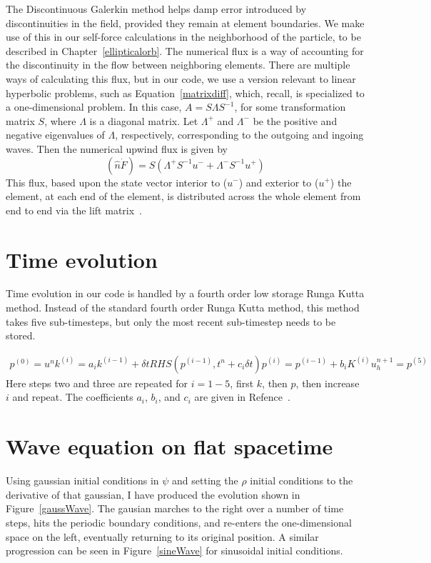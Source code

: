 The Discontinuous Galerkin method helps damp error introduced by discontinuities in the field, provided they remain at element boundaries. We make use of this in our self-force calculations in the neighborhood of the particle, to be described in Chapter~\ref{ellipticalorb}. The numerical flux is a way of accounting for the discontinuity in the flow between neighboring elements. There are multiple ways of calculating this flux, but in our code, we use a version relevant to linear hyperbolic problems, such as Equation~\ref{matrixdiff}, which, recall, is specialized to a one-dimensional problem. In this case, $A=S\Lambda S^{-1}$, for some transformation matrix $S$, where $\Lambda$ is a diagonal matrix. Let $\Lambda^+$ and $\Lambda^-$ be the positive and negative eigenvalues of $\Lambda$, respectively, corresponding to the outgoing and ingoing waves. Then the numerical upwind flux is given by
\begin{equation}
  (\hat{n}\dot F)=S(\Lambda^+ S^{-1} u^- + \Lambda^- S^{-1} u^+)
\end{equation}
This flux, based upon the state vector interior to ($u^-$) and exterior to ($u^+$) the element, at each end of the element, is distributed across the whole element from end to end via the lift matrix~\cite{dghesthaven}.


\section{Time evolution}

Time evolution in our code is handled by a fourth order low storage Runga Kutta method. Instead of the standard fourth order Runga Kutta method, this method takes five sub-timesteps, but only the most recent sub-timestep needs to be stored.

\begin{eqnarray}
  p^{(0)}=u^n
  k^{(i)}=a_ik^{(i-1)}+\delta t RHS(p^{(i-1)},t^n+c_i\delta t)
  p^{(i)}=p^{(i-1)}+b_iK^{(i)}
  u_h^{n+1}=p^{(5)}
\end{eqnarray}
Here steps two and three are repeated for $i=1-5$, first $k$, then $p$, then increase $i$ and repeat. The coefficients $a_i$, $b_i$, and $c_i$ are given in Refence~\cite{dghesthaven}.

\section{Wave equation on flat spacetime}

Using gaussian initial conditions in $\psi$ and setting the $\rho$ initial conditions to the derivative of that gaussian, I have produced the evolution shown in Figure~\ref{gaussWave}. The gausian marches to the right over a number of time steps, hits the periodic boundary conditions, and re-enters the one-dimensional space on the left, eventually returning to its original position. A similar progression can be seen in Figure~\ref{sineWave} for sinusoidal initial conditions.

